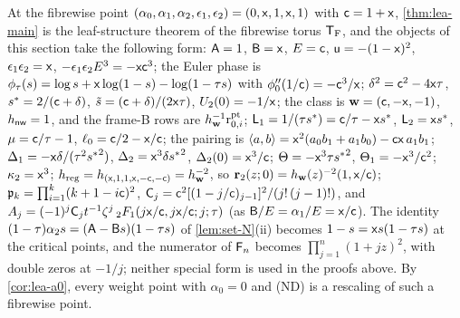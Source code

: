 \begin{rmk}
\label{rmk:lea-fibrewise}
At the fibrewise point $(\alpha_0,\alpha_1,\alpha_2,\epsilon_1,\epsilon_2) = (0,\mathsf{x},1,\mathsf{x},1)$ with $\mathsf{c} = 1+\mathsf{x}$, \cref{thm:lea-main} is the leaf-structure theorem of the fibrewise torus $\mathsf{T}_{\mathrm{F}}$, and the objects of this section take the following form: $\mathsf{A} = 1$, $\mathsf{B} = \mathsf{x}$, $E = \mathsf{c}$, $\mathsf{u} = -(1-\mathsf{x})^2$, $\epsilon_1\epsilon_2 = \mathsf{x}$, $-\epsilon_1\epsilon_2E^3 = -\mathsf{x}\mathsf{c}^3$; the Euler phase is $\phi_\tau(s) = \log s + \mathsf{x}\log(1-s) - \log(1-\tau s)$ with $\phi_0''(1/\mathsf{c}) = -\mathsf{c}^3/\mathsf{x}$; $\delta^2 = \mathsf{c}^2 - 4\mathsf{x}\tau$, $s^{\ast} = 2/(\mathsf{c}+\delta)$, $\tilde{s} = (\mathsf{c}+\delta)/(2\mathsf{x}\tau)$, $U_2(0) = -1/\mathsf{x}$; the class is $\mathbf{w} = (\mathsf{c},-\mathsf{x},-1)$, $h_{\mathsf{nw}} = 1$, and the frame-B rows are $h_{\mathbf{w}}^{-1}\mathrm{r}^{\mathrm{pt}}_{0,i}$; $\mathsf{L}_1 = 1/(\tau s^{\ast}) = \mathsf{c}/\tau - \mathsf{x}s^{\ast}$, $\mathsf{L}_2 = \mathsf{x}s^{\ast}$, $\mu = \mathsf{c}/\tau - 1$, $\ell_0 = \mathsf{c}/2 - \mathsf{x}/\mathsf{c}$; the pairing is $\langle a,b\rangle = \mathsf{x}^2(a_0b_1+a_1b_0) - \mathsf{c}\mathsf{x}\,a_1b_1$; $\Delta_1 = -\mathsf{x}\delta/(\tau^2{s^{\ast}}^2)$, $\Delta_2 = \mathsf{x}^3\delta{s^{\ast}}^2$, $\Delta_2(0) = \mathsf{x}^3/\mathsf{c}$; $\Theta = -\mathsf{x}^3\tau{s^{\ast}}^2$, $\Theta_1 = -\mathsf{x}^3/\mathsf{c}^2$; $\kappa_2 = \mathsf{x}^3$; $h_{\mathrm{reg}} = h_{(\mathsf{x},1,1,\mathsf{x},-\mathsf{c},-\mathsf{c})} = h_{\mathbf{w}}^{-2}$, so $\mathbf{r}_2(z;0) = h_{\mathbf{w}}(z)^{-2}(1,\mathsf{x}/\mathsf{c})$; $\mathfrak{p}_k = \prod_{i=1}^{k}(k+1-i\mathsf{c})^2$, $\mathsf{C}_j = \mathsf{c}^2[(1-j/\mathsf{c})_{j-1}]^2/(j!\,(j-1)!)$, and $A_j = (-1)^j\mathsf{C}_jt^{-1}\zeta^j\,{}_2F_1(j\mathsf{x}/\mathsf{c},j\mathsf{x}/\mathsf{c};j;\tau)$ (as $\mathsf{B}/E = \alpha_1/E = \mathsf{x}/\mathsf{c}$). The identity $(1-\tau)\alpha_2s = (\mathsf{A}-\mathsf{B} s)(1-\tau s)$ of \cref{lem:set-N}(ii) becomes $1-s = \mathsf{x} s(1-\tau s)$ at the critical points, and the numerator of $\mathsf{F}_n$ becomes $\prod_{j=1}^{n}(1+jz)^2$, with double zeros at $-1/j$; neither special form is used in the proofs above. By \cref{cor:lea-a0}, every weight point with $\alpha_0 = 0$ and (ND) is a rescaling of such a fibrewise point.
\end{rmk}
